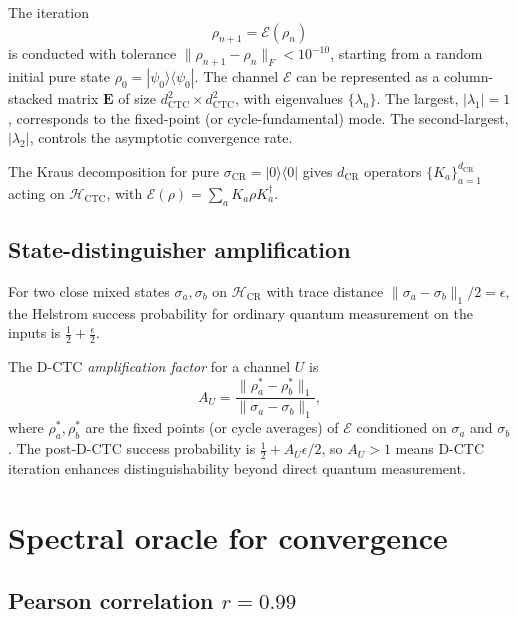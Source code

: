 \documentclass[11pt,a4paper]{article}
\begin{document}
The iteration
\begin{equation}
\rho_{n+1} = \mathcal{E}(\rho_n)
\end{equation}
is conducted with tolerance $\| \rho_{n+1} - \rho_n \|_F < 10^{-10}$,
starting from a random initial pure state
$\rho_0 = |\psi_0\rangle\langle\psi_0|$. The channel $\mathcal{E}$
can be represented as a column-stacked matrix $\mathbf{E}$ of size
$d_{\text{CTC}}^2 \times d_{\text{CTC}}^2$, with eigenvalues
$\{\lambda_n\}$. The largest, $|\lambda_1| = 1$, corresponds to the
fixed-point (or cycle-fundamental) mode. The second-largest,
$|\lambda_2|$, controls the asymptotic convergence rate.

The Kraus decomposition for pure $\sigma_{\text{CR}} = |0\rangle\langle 0|$ gives
$d_{\text{CR}}$ operators $\{K_a\}_{a=1}^{d_{\text{CR}}}$ acting on
$\mathcal{H}_{\text{CTC}}$, with $\mathcal{E}(\rho) = \sum_a K_a \rho K_a^\dagger$.

\subsection{State-distinguisher amplification}

For two close mixed states $\sigma_a, \sigma_b$ on $\mathcal{H}_{\text{CR}}$
with trace distance $\| \sigma_a - \sigma_b \|_1 / 2 = \epsilon$, the
Helstrom \cite{Helstrom1976} success probability for ordinary
quantum measurement on the inputs is $\frac{1}{2} + \frac{\epsilon}{2}$.

The D-CTC \emph{amplification factor} for a channel $U$ is
\begin{equation}
A_U = \frac{\| \rho_a^* - \rho_b^* \|_1}{\| \sigma_a - \sigma_b \|_1},
\end{equation}
where $\rho_a^*, \rho_b^*$ are the fixed points (or cycle averages)
of $\mathcal{E}$ conditioned on $\sigma_a$ and $\sigma_b$. The
post-D-CTC success probability is $\frac{1}{2} + A_U \epsilon / 2$,
so $A_U > 1$ means D-CTC iteration enhances distinguishability beyond
direct quantum measurement.

\section{Spectral oracle for convergence}

\subsection{Pearson correlation $r = 0.99$}
\end{document}
